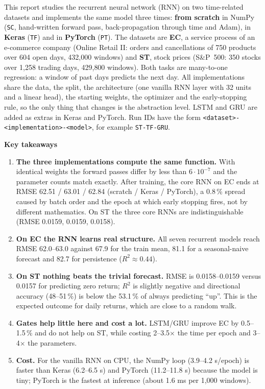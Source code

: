 \documentclass[11pt, a4paper]{article}
\newcommand{\run}[1]{\texttt{#1}}
\begin{document}
This report studies the recurrent neural network (RNN) on two time-related datasets and implements the same model
three times: \textbf{from scratch} in NumPy (\run{SC}, hand-written forward pass, back-propagation through time and Adam),
in \textbf{Keras} (\run{TF}) and in \textbf{PyTorch} (\run{PT}). The datasets are \textbf{EC}, a service process of an
e-commerce company (Online Retail II: orders and cancellations of 750 products over 604 open days, 432{,}000 windows)
and \textbf{ST}, stock prices (S\&P~500: 350 stocks over 1{,}258 trading days, 429{,}800 windows). Both tasks are
many-to-one regression: a window of past days predicts the next day. All implementations share the data, the split, the
architecture (one vanilla RNN layer with 32 units and a linear head), the starting weights, the optimizer and the
early-stopping rule, so the only thing that changes is the abstraction level. LSTM and GRU are added as extras in Keras
and PyTorch. Run IDs have the form \run{<dataset>-<implementation>-<model>}, for example \run{ST-TF-GRU}.

\begin{table}[H]
\centering
\caption{All 14 runs, test period. RMSE in units sold (EC, top block) and in log-return (ST, bottom block);
$R^2$ is out-of-sample against the train-mean predictor; s/epoch = median time per epoch on CPU.}
\label{tab:summary}
\small

\end{table}

\textbf{Key takeaways}
\begin{enumerate}
\item \textbf{The three implementations compute the same function.} With identical weights the forward passes differ by
  less than $6\cdot10^{-7}$ and the parameter counts match exactly. After training, the core RNN on EC ends at RMSE
  62.51 / 63.01 / 62.84 (scratch / Keras / PyTorch), a 0.8\,\% spread caused by batch order and the epoch at which early
  stopping fires, not by different mathematics. On ST the three core RNNs are indistinguishable (RMSE 0.0159, 0.0159, 0.0158).
\item \textbf{On EC the RNN learns real structure.} All seven recurrent models reach RMSE 62.0--63.0 against 67.9 for the
  train mean, 81.1 for a seasonal-naive forecast and 82.7 for persistence ($R^2\approx0.44$).
\item \textbf{On ST nothing beats the trivial forecast.} RMSE is 0.0158--0.0159 versus 0.0157 for predicting zero return;
  $R^2$ is slightly negative and directional accuracy (48--51\,\%) is below the 53.1\,\% of always predicting ``up''.
  This is the expected outcome for daily returns, which are close to a random walk.
\item \textbf{Gates help little here and cost a lot.} LSTM/GRU improve EC by 0.5--1.5\,\% and do not help on ST, while
  costing 2--3.5$\times$ the time per epoch and 3--4$\times$ the parameters.
\item \textbf{Cost.} For the vanilla RNN on CPU, the NumPy loop (3.9--4.2 s/epoch) is faster than Keras (6.2--6.5 s) and PyTorch
  (11.2--11.8 s) because the model is tiny; PyTorch is the fastest at inference (about 1.6 ms per 1{,}000 windows).
\end{enumerate}
\end{document}
